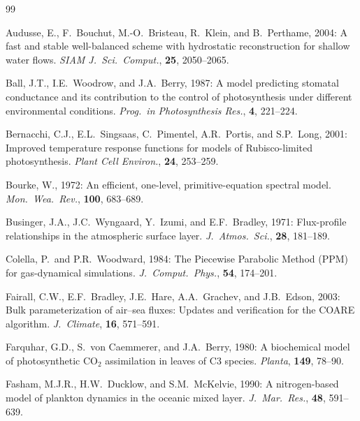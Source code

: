 \documentclass[11pt,twoside]{report}
\begin{document}
\renewcommand{\bibname}{References}
\begin{thebibliography}{99}

Audusse, E., F.~Bouchut, M.-O.~Bristeau, R.~Klein, and B.~Perthame, 2004:
A fast and stable well-balanced scheme with hydrostatic reconstruction for
shallow water flows.
\textit{SIAM J.\ Sci.\ Comput.}, \textbf{25}, 2050--2065.

Ball, J.T., I.E.~Woodrow, and J.A.~Berry, 1987:
A model predicting stomatal conductance and its contribution to the control
of photosynthesis under different environmental conditions.
\textit{Prog.\ in Photosynthesis Res.}, \textbf{4}, 221--224.

Bernacchi, C.J., E.L.~Singsaas, C.~Pimentel, A.R.~Portis, and S.P.~Long, 2001:
Improved temperature response functions for models of Rubisco-limited
photosynthesis.
\textit{Plant Cell Environ.}, \textbf{24}, 253--259.

Bourke, W., 1972:
An efficient, one-level, primitive-equation spectral model.
\textit{Mon.\ Wea.\ Rev.}, \textbf{100}, 683--689.

Businger, J.A., J.C.~Wyngaard, Y.~Izumi, and E.F.~Bradley, 1971:
Flux-profile relationships in the atmospheric surface layer.
\textit{J.\ Atmos.\ Sci.}, \textbf{28}, 181--189.

Colella, P.\ and P.R.~Woodward, 1984:
The Piecewise Parabolic Method (PPM) for gas-dynamical simulations.
\textit{J.\ Comput.\ Phys.}, \textbf{54}, 174--201.

Fairall, C.W., E.F.~Bradley, J.E.~Hare, A.A.~Grachev, and J.B.~Edson, 2003:
Bulk parameterization of air--sea fluxes: Updates and verification for the
COARE algorithm.
\textit{J.\ Climate}, \textbf{16}, 571--591.

Farquhar, G.D., S.~von Caemmerer, and J.A.~Berry, 1980:
A biochemical model of photosynthetic CO$_2$ assimilation in leaves of
C3 species.
\textit{Planta}, \textbf{149}, 78--90.

Fasham, M.J.R., H.W.~Ducklow, and S.M.~McKelvie, 1990:
A nitrogen-based model of plankton dynamics in the oceanic mixed layer.
\textit{J.\ Mar.\ Res.}, \textbf{48}, 591--639.


\end{thebibliography}
\end{document}
